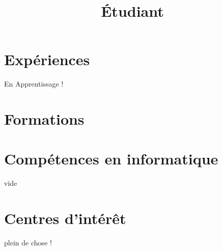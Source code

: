 \documentclass[12pt,a4paper]{moderncv}
\title{Étudiant }
\begin{document}
\maketitle
\vspace*{-2.5\baselineskip}
\section{Expériences}
En Apprentissage ! 
\section{Formations}
\section{Compétences en informatique}
vide
\section{Centres d'intérêt}
plein de chose !
\end{document}
